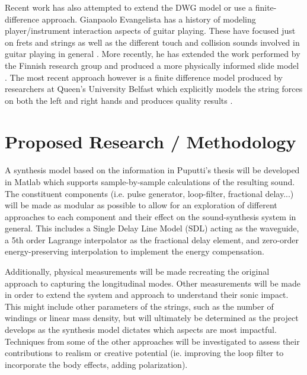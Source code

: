 \documentclass[12pt]{article}
\begin{document}
Recent work has also attempted to extend the DWG model or use a finite-difference approach. Gianpaolo Evangelista has a history of modeling player/instrument interaction aspects of guitar playing. These have focused just on frets and strings \cite{evangelista_physical_2011} as well as the different touch and collision sounds involved in guitar playing in general \cite{evangelista_playerinstrument_2010}. More recently, he has extended the work performed by the Finnish research group and produced a more physically informed slide model \cite{evangelista_physical_2012}. The most recent approach however is a finite difference model produced by researchers at Queen’s University Belfast which explicitly models the string forces on both the left and right hands and produces quality results \cite{bhanuprakash_finite_2020}.

\section*{Proposed Research / Methodology}
\paragraph{}
A synthesis model based on the information in Puputti's thesis will be developed in Matlab which supports sample-by-sample calculations of the resulting sound. The constituent components (i.e. pulse generator, loop-filter, fractional delay...) will be made as modular as possible to allow for an exploration of different approaches to each component and their effect on the sound-synthesis system in general. This includes a Single Delay Line Model (SDL) acting as the waveguide, a 5th order Lagrange interpolator as the fractional delay element, and zero-order energy-preserving interpolation to implement the energy compensation.

Additionally, physical measurements will be made recreating the original approach to capturing the longitudinal modes. Other measurements will be made in order to extend the system and approach to understand their sonic impact. This might include other parameters of the strings, such as the number of windings or linear mass density, but will ultimately be determined as the project develops as the synthesis model dictates which aspects are most impactful. Techniques from some of the other approaches will be investigated to assess their contributions to realism or creative potential (ie. improving the loop filter to incorporate the body effects, adding polarization).
\end{document}

